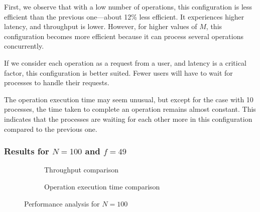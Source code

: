 \documentclass{article}
\begin{document}
First, we observe that with a low number of operations,
this configuration is less efficient than the previous
one—about 12\% less efficient. It experiences higher latency,
and throughput is lower. However, for higher values of $M$, this
configuration becomes more efficient because it can process several
operations concurrently.

If we consider each operation as a request from a user,
and latency is a critical factor, this configuration is better suited.
 Fewer users will have to wait for processes to handle their requests.

The operation execution time may seem unusual, but except for the
case with 10 processes, the time taken to complete an operation
remains almost constant. This indicates that the processes are
waiting for each other more in this configuration compared to the
previous one.
\newpage
\subsubsection{Results for \(N = 100\) and \(f = 49\)}
\begin{figure}[h!]
    \centering
    \begin{subfigure}{0.55\textwidth}
    \caption{Throughput comparison }
\end{subfigure}%
\begin{subfigure}{.55\textwidth}
    \caption{Operation execution time comparison}
\end{subfigure}
\caption{Performance analysis for \( N = 100 \)}
\end{figure}
\end{document}
